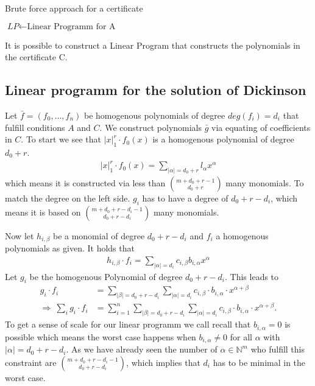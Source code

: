 \documentclass[./main.tex]{subfiles}
\begin{document}
\begin{algorithm}
\caption{Brute force approach for a certificate}\label{euclid}
\begin{algorithmic}[1]
\State $\textit{LP} \gets \text{Linear Programm for A}$\\
 {
}
\end{algorithmic}
\end{algorithm}


It is possible to construct a Linear Program that constructs the polynomials in the certificate C.
\subsection{Linear programm for the solution of Dickinson}


Let $\bar f = (f_0,\dots,f_n)$ be homogenous polynomials of degree $deg(f_i) = d_i$  that fulfill conditions $A$ and $C$. We construct polynomials $\bar g$ via equating of coefficients in $C$. To start we see that $\vert x \vert_1^r \cdot f_0(x)$ is a homogenous polynomial of degree $d_0+r$.
\begin{align*}
\vert x \vert_1^r \cdot f_0(x) = \sum_{\vert \alpha \vert = d_0+r} l_\alpha x^\alpha
\end{align*}
which means it is constructed via less than $\binom{m+ d_0+r -1 }{d_0+r}$ many monomials. To match the degree on the left side. $g_i$ has to have a degree of $d_0+r-d_i$, which means it is based on $ \binom {m + d_0+r-d_i-1} {d_0+r-d_i}$ many monomials.

Now let $h_{i,\beta}$ be a monomial of degree $d_0+r-d_i$ and $f_i$ a homogenous polynomials as given. It holds that
\begin{align*}
h_{i,\beta} \cdot f_i = \sum_{\vert \alpha \vert = d_i} c_{i,\beta} b_{i,\alpha} x^\alpha
\end{align*}
Let $g_i$ be the homogenous Polynomial of degree $d_0+r-d_i$. This leads to
\begin{align*}
g_i \cdot f_i &= \sum_{\vert \beta \vert = d_0+r-d_i}  \sum_{\vert \alpha \vert = d_i} c_{i,\beta} \cdot b_{i,\alpha} \cdot x^{\alpha+\beta}\\
\Rightarrow \ \sum_i g_i \cdot f_i &=  \sum_{i=1}^n \sum_{\vert \beta \vert = d_0+r-d_i}  \sum_{\vert \alpha \vert = d_i} c_{i,\beta} \cdot b_{i,\alpha} \cdot x^{\alpha+\beta}.
\end{align*}
To get a sense of scale for our linear programm we call recall that $b_{i,\alpha} = 0 $ is possible which means the worst case happens when  $b_{i,\alpha} \neq 0 $ for all $\alpha$ with $\vert \alpha \vert = d_0+r -d_i$. As we have already seen the number of $\alpha\in \mathbb{N}^m$ who fulfill this constraint are $ \binom {m +d_0+r -d_i -1 } {d_0+r -d_i}$,  which implies that $d_i$ has to be minimal in the worst case.
\end{document}
